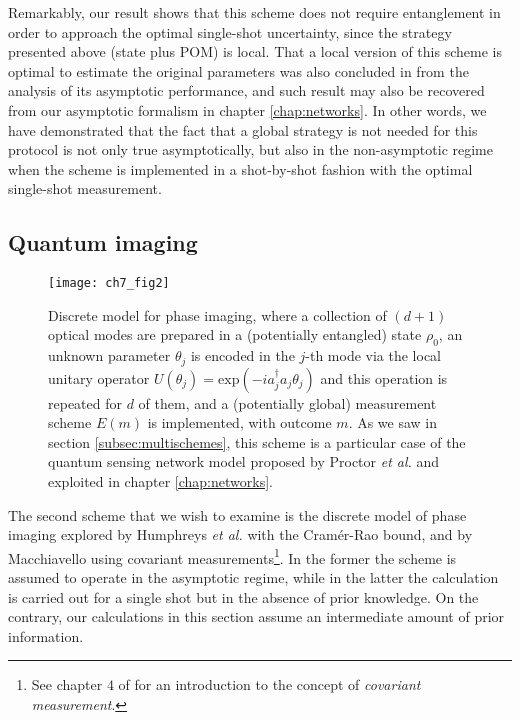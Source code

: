 Remarkably, our result shows that this scheme does not require entanglement in order to approach the optimal single-shot uncertainty, since the strategy presented above (state plus POM) is local. That a local version of this scheme is optimal to estimate the original parameters was also concluded in \cite{proctor2017networked} from the analysis of its asymptotic performance, and such result may also be recovered from our asymptotic formalism in chapter \ref{chap:networks}. In other words, we have demonstrated that the fact that a global strategy is not needed for this protocol is not only true asymptotically, but also in the non-asymptotic regime when the scheme is implemented in a shot-by-shot fashion with the optimal single-shot measurement.

\subsection{Quantum imaging}

\begin{figure}[t]
\centering
\texttt{[image: ch7\_fig2]}
\caption[Discrete model for phase imaging]{Discrete model for phase imaging, where a collection of $(d+1)$ optical modes are prepared in a (potentially entangled) state $\rho_0$, an unknown parameter $\theta_j$ is encoded in the $j$-th mode via the local unitary operator $U(\theta_j) = \mathrm{exp}(-i a_j^\dagger a_j \theta_j)$ and this operation is repeated for $d$ of them, and a (potentially global) measurement scheme $E(m)$ is implemented, with outcome $m$. As we saw in section \ref{subsec:multischemes}, this scheme is a particular case of the quantum sensing network model proposed by Proctor \emph{et al.} \cite{proctor2017networked} and exploited in chapter \ref{chap:networks}.}
\label{imagingmodel}
\end{figure}

The second scheme that we wish to examine is the discrete model of phase imaging explored by Humphreys \emph{et al.} \cite{humphreys2013} with the Cram\'{e}r-Rao bound, and by Macchiavello \cite{chiara2003} using covariant measurements\footnote{See chapter $4$ of \cite{holevo2011} for an introduction to the concept of \emph{covariant measurement}.}. In the former the scheme is assumed to operate in the asymptotic regime, while in the latter the calculation is carried out for a single shot but in the absence of prior knowledge. On the contrary, our calculations in this section assume an intermediate amount of prior information. 

